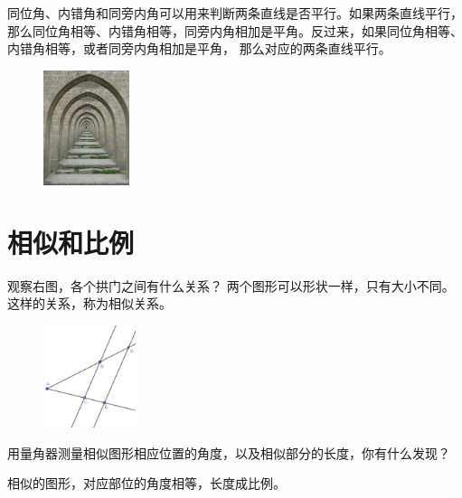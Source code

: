 \documentclass[12pt,UTF8]{ctexbook}
\begin{document}
同位角、内错角和同旁内角可以用来判断两条直线是否平行。如果两条直线平行，
那么同位角相等、内错角相等，同旁内角相加是平角。反过来，如果同位角相等、内错角相等，或者同旁内角相加是平角，
那么对应的两条直线平行。
\begin{figure} %
    \vspace{50pt}
    \includegraphics[width=0.225\textwidth]{675px-Diyarbakir_1050645_Droste_Effect.jpg}
\end{figure}

\section{相似和比例}
观察右图，各个拱门之间有什么关系？
两个图形可以形状一样，只有大小不同。
这样的关系，称为相似关系。

\begin{figure} %
    \vspace{-15pt}
    \includegraphics[width=0.24\textwidth]{比例1.png}
\end{figure}

用量角器测量相似图形相应位置的角度，以及相似部分的长度，你有什么发现？

相似的图形，对应部位的角度相等，长度成比例。
\end{document}
